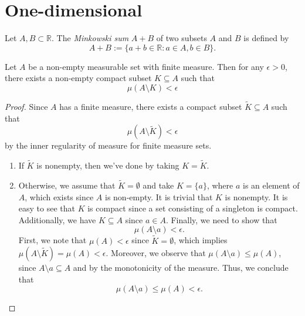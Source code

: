 \section{One-dimensional}

\begin{definition}
    Let \(A, B \subset \mathbb{R}\). The \textit{Minkowski sum} \(A+B\) of two subsets \(A\) and \(B\) is defined by
    \begin{equation*}
        A+B:= \{a+b\in\mathbb{R} : a \in A, b \in B\}.
    \end{equation*}
\end{definition}

\begin{lemma}
    Let \(A\) be a non-empty measurable set with finite measure. 
    Then for any \(\epsilon > 0\), there exists a non-empty compact subset \(K \subseteq A\) such that 
    \begin{equation*}
        \mu(A \setminus K) < \epsilon
    \end{equation*}
    \label{lemma: exists_isCompact_Nonempty_diff_lt}
\end{lemma}

\begin{proof}
    Since \(A\) has a finite measure, there exists a compact subset \(\widetilde{K} \subseteq A\) such that 
    \begin{equation*}
        \mu (A \setminus \widetilde{K}) < \epsilon
    \end{equation*}
    by the inner regularity of measure for finite measure sets.
    \begin{enumerate}
        \item If \(\widetilde{K}\) is nonempty, then we've done by taking \(K = \widetilde{K}\).
        \item Otherwise, we assume that \(\widetilde{K} = \emptyset\) and take \(K = \{a\}\), where \(a\) is an element of \(A\), which exists since \(A\) is non-empty. 
        It is trivial that \(K\) is nonempty. It is easy to see that \(K\) is compact since a set consisting of a singleton is compact.
        Additionally, we have \(K \subseteq A\) since \(a \in A\). Finally, we need to show that 
        \begin{equation*}
            \mu(A \setminus {a}) < \epsilon.
        \end{equation*}
        First, we note that \(\mu(A)<\epsilon\) since \(\widetilde{K} = \emptyset\), which implies \(\mu(A\setminus \widetilde{K}) = \mu(A) < \epsilon\).
        Moreover, we observe that \(\mu(A \setminus {a}) \leq \mu(A)\), since \(A\setminus {a} \subseteq A\) and by the monotonicity of the measure. 
        Thus, we conclude that
        \begin{equation*}
            \mu (A \setminus {a}) \leq \mu(A) < \epsilon.
        \end{equation*}
    \end{enumerate}
\end{proof}

